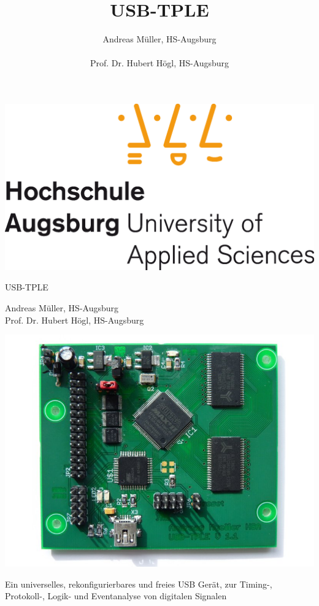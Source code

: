 \documentclass[
a4paper,
]{leaflet}
\title{USB-TPLE}
\author{
  Andreas M\"uller, HS-Augsburg\\
  \\
  Prof. Dr. Hubert H\"ogl, HS-Augsburg}
\newcommand{\changefont}[3]{ \fontfamily{#1} \fontseries{#2} \fontshape{#3} \selectfont}
\begin{document}



\changefont{pag}{m}{n}


\begin{flushright}

\includegraphics [scale=0.2]{logo.png}

\end{flushright}

\begin{center}

\vskip 30pt

\Huge USB-TPLE\\

\bigskip

\vskip 30pt

\large Andreas M\"uller, HS-Augsburg\\Prof. Dr. Hubert H\"ogl, HS-Augsburg

\vskip 30pt

\includegraphics [scale=1.0]{board.jpg}

\vskip 30pt

\Large Ein universelles, rekonfigurierbares und freies USB Ger\"at, zur Timing-, Protokoll-, Logik- und Eventanalyse von digitalen Signalen
\end{center}
\end{document}
